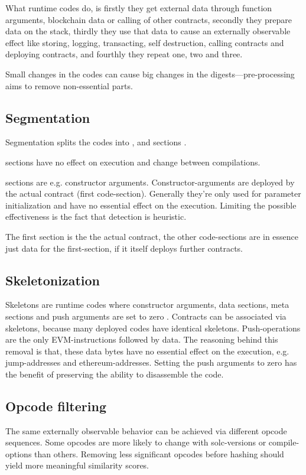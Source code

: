 \documentclass[../main.tex]{subfiles}
\begin{document}
What runtime codes do, is firstly they get external data through function arguments, blockchain data or calling of other contracts, secondly they prepare data on the stack, thirdly they use that data to cause an externally observable effect like storing, logging, transacting, self destruction, calling contracts and deploying contracts, and fourthly they repeat one, two and three.

Small changes in the codes can cause big changes in the digests---pre-processing aims to remove non-essential parts.

\subsection{Segmentation \label{sec:seg}}
Segmentation splits the codes into ,  and  sections \cite{ethutils}.

 sections have no effect on execution and change between compilations.

 sections are e.g. constructor arguments.
Constructor-arguments are deployed by the actual contract (first code-section).
Generally they're only used for parameter initialization and have no essential effect on the execution.
Limiting the possible effectiveness is the fact that detection is heuristic.

The first  section is the the actual contract, the other code-sections are in essence just data for the first-section, if it itself deploys further contracts.

\subsection{Skeletonization \label{sec:skel}}
Skeletons are runtime codes where constructor arguments, data sections, meta sections and push arguments are set to zero \cite{ethutils}.
Contracts can be associated via skeletons, because many deployed codes have identical skeletons.
Push-operations are the only EVM-instructions followed by data.
The reasoning behind this removal is that, these data bytes have no essential effect on the execution, e.g. jump-addresses and ethereum-addresses.
Setting the push arguments to zero has the benefit of preserving the ability to disassemble the code.

\subsection{Opcode filtering}
The same externally observable behavior can be achieved via different opcode sequences.
Some opcodes are more likely to change with solc-versions or compile-options than others.
Removing less significant opcodes before hashing should yield more meaningful similarity scores.
\end{document}
